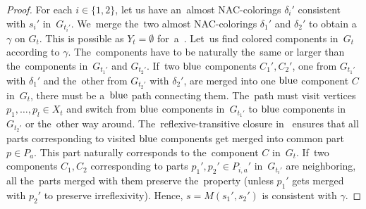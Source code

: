 %
\begin{proof}
	For each \( i \in \{1, 2\} \),
	let us have an~almost NAC-colorings \( \delta_i' \) consistent with
	\( s_i' \) in~\( G_{t_i'} \).
	We~merge the~two almost NAC-colorings \( \delta_1' \) and \( \delta_2' \)
	to obtain a~\rbcol{} \( \gamma \) on \( G_t \).
	This is possible as \( Y_t = \emptyset \) for~a~\JoinNode{}.
	Let~us find colored components in~\( G_t \) according to \(	\gamma \).
	The~components have to be naturally the~same or larger
	than the~components in~\( G_{t_1'} \) and \( G_{t_2'} \).
	If~two \( \text{blue} \) components \( C_1', C_2' \),
	one from \( G_{t_1'} \) with \( \delta_1' \) and
	the~other from \( G_{t_2'} \) with \( \delta_2' \),
	are merged into one \( \text{blue} \) component \( C \) in~\( G_t \),
	there must be a~\( \text{blue} \) path connecting them.
	The~path must visit vertices \( p_1, \dots, p_l \in X_t \)
	and switch from \( \text{blue} \) components in~\( G_{t_1'} \)
	to \( \text{blue} \) components in~\( G_{t_2'} \) or the~other way around.
	The~reflexive-transitive closure in~
	ensures that all parts corresponding to visited \( \text{blue} \) components
	get merged into common part \( p \in P_a \).
	This part naturally corresponds to the~component \( C \) in~\( G_t \).
	If~two components \( C_1, C_2 \) corresponding to
	parts \( p_1', p_2' \in P_{i,a}' \) in~\( G_{t_i'} \) are neighboring,
	all the~parts merged with them preserve the~property
	(unless \( p_1' \) gets merged with \( p_2' \) to preserve irreflexivity).
	Hence, \( s = M(s_1', s_2') \) is consistent with \( \gamma \).
\end{proof}

